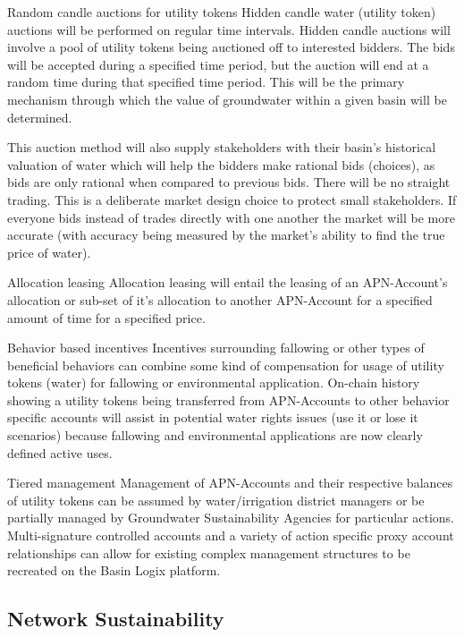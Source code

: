 \documentclass{tufte-handout}
\begin{document}
Random candle auctions for utility tokens \break
Hidden candle water (utility token) auctions will be performed on regular time intervals. Hidden candle auctions\cite{candle} will involve a pool of utility tokens being auctioned off to interested bidders. The bids will be accepted during a specified time period, but the auction will end at a random time during that specified time period. This will be the primary mechanism through which the value of groundwater within a given basin will be determined. 

This auction method will also supply stakeholders with their basin's historical valuation of water which will help the bidders make rational bids (choices), as bids are only rational when compared to previous bids\cite{Allingham}. There will be no straight trading. This is a deliberate market design choice to protect small stakeholders\cite{Raffensperger}. If everyone bids instead of trades directly with one another the market will be more accurate (with accuracy being measured by the market's ability to find the true price of water).\break

Allocation leasing \break
Allocation leasing will entail the leasing of an APN-Account's allocation or sub-set of it's allocation to another APN-Account for a specified amount of time for a specified price.\break

Behavior based incentives \break
Incentives surrounding fallowing or other types of beneficial behaviors can combine some kind of compensation for usage of utility tokens (water) for fallowing or environmental application\cite{tule}. On-chain history showing a utility tokens being transferred from APN-Accounts to other behavior specific accounts will assist in potential water rights issues (use it or lose it scenarios) because fallowing and environmental applications are now clearly defined active uses.\break

Tiered management \break
Management of APN-Accounts and their respective balances of utility tokens can be assumed by water/irrigation district managers or be partially managed by Groundwater Sustainability Agencies for particular actions. Multi-signature controlled accounts and a variety of action specific proxy account relationships\cite{proxy} can allow for existing complex management structures to be recreated on the Basin Logix platform.\break 

\subsection{Network Sustainability}\label{sec:headings}
\end{document}
